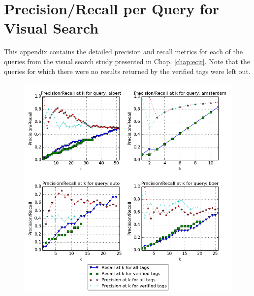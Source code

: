 \chapter{Precision/Recall per Query for Visual Search}\label{appen:prec-recall}
This appendix contains the detailed precision and recall metrics for each of the queries from the visual search study presented in Chap. \ref{chap:ecir}. Note that the queries for which there were no results returned by the verified tags were left out.

\begin{figure}[H]
\centering
\includegraphics[scale=.55]{appendixa/queries1}
\end{figure}


